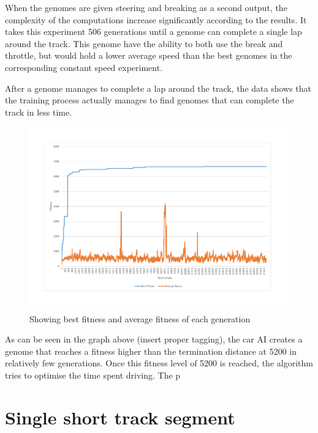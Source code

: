 When the genomes are given steering and breaking as a second output, the complexity of the computations increase significantly according to the results. It takes this experiment 506 generations until a genome can complete a single lap around the track. This genome have the ability to both use the break and throttle, but would hold a lower average speed than the best genomes in the corresponding constant speed experiment.

After a genome manages to complete a lap around the track, the data shows that the training process actually manages to find genomes that can complete the track in less time. 


\begin{figure}[h]
\includegraphics[width=\textwidth]{report/images/graphs/fitness}
\centering
\caption{Showing best fitness and average fitness of each generation}
\end{figure}

As can be seen in the graph above (insert proper tagging), the car AI creates a genome that reaches a fitness higher than the termination distance at 5200 in relatively few generations. Once this fitness level of 5200 is reached, the algorithm tries to optimise the time spent driving. The p

\section{Single short track segment}


